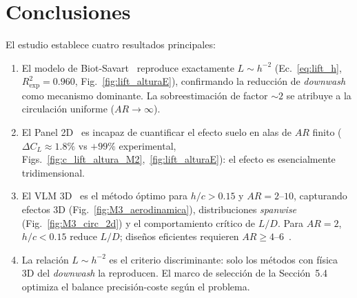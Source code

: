 \documentclass[twocolumn]{article}
\begin{document}
\section{Conclusiones}

El estudio establece cuatro resultados principales:

\begin{enumerate}
    \item El modelo de Biot-Savart~\cite{wieselsberger1922} reproduce exactamente $L \sim h^{-2}$ (Ec.~\eqref{eq:lift_h}, $R^2_{\exp} = 0.960$, Fig.~\ref{fig:lift_alturaE}), confirmando la reducción de \textit{downwash} como mecanismo dominante. La sobreestimación de factor $\sim 2$ se atribuye a la circulación uniforme ($AR \to \infty$).

    \item El Panel 2D~\cite{hess1967} es incapaz de cuantificar el efecto suelo en alas de $AR$ finito ($\Delta C_L \approx 1.8\%$ vs $+99\%$ experimental, Figs.~\ref{fig:c_lift_altura_M2},~\ref{fig:lift_alturaE}): el efecto es esencialmente tridimensional.

    \item El VLM 3D~\cite{katz2001} es el método óptimo para $h/c > 0.15$ y $AR = 2$--$10$, capturando efectos 3D (Fig.~\ref{fig:M3_aerodinamica}), distribuciones \textit{spanwise} (Fig.~\ref{fig:M3_circ_2d}) y el comportamiento crítico de $L/D$. Para $AR = 2$, $h/c < 0.15$ reduce $L/D$; diseños eficientes requieren $AR \geq 4$--$6$~\cite{rozhdestvensky2006}.

    \item La relación $L \sim h^{-2}$ es el criterio discriminante: solo los métodos con física 3D del \textit{downwash} la reproducen. El marco de selección de la Sección~5.4 optimiza el balance precisión-coste según el problema.
\end{enumerate}

\printbibliography
\end{document}
